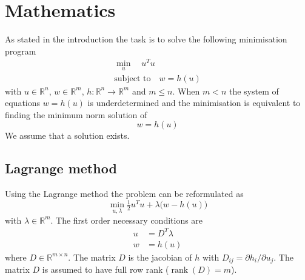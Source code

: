 \documentclass[english,memorandum,old,sectionpage]{cpbart}
\newcommand{\Rbb}{\mathbb{R}}
\begin{document}
\section{Mathematics}
As stated in the introduction the task is to solve
the following minimisation program
\begin{subequations}\label{eqn:min}
\begin{gather}
\min _u \quad u^T u    \\
\mbox{subject to} \quad w = h(u)
\end{gather}
\end{subequations}
with $u \in \Rbb^n$, $w \in \Rbb^m$, $h:\Rbb^n \rightarrow \Rbb^m$
and $m \le n$.
When $m < n$ the system of equations $w = h(u)$ is underdetermined and
the minimisation is equivalent to finding the minimum norm solution of
\begin{equation}\label{eqn:orgweqh}
w = h(u)
\end{equation}
We assume that a solution exists.

\subsection*{Lagrange method}
Using the Lagrange method the problem can be reformulated as
\begin{equation}\label{eqn:lagrangefull}
\min_{u, \lambda} \tfrac{1}{2} u^T u + \lambda \bigl(w - h(u)\bigr)
\end{equation}
with $\lambda \in \Rbb^m$.
%
The first order necessary conditions are
\begin{subequations}
\begin{align}
u &= D^T \lambda \label{eqn:ueqdtl} \\
w &=h(u)  \label{eqn:weqh}
\end{align}
\end{subequations}
%
where $D \in \Rbb^{m \times n}$.
The matrix $D$ is the jacobian of $h$ with
$D_{ij} = \partial h_i / \partial u_j$. The matrix $D$ is assumed to
have full row rank ($\operatorname{rank}(D)=m$).
\end{document}
